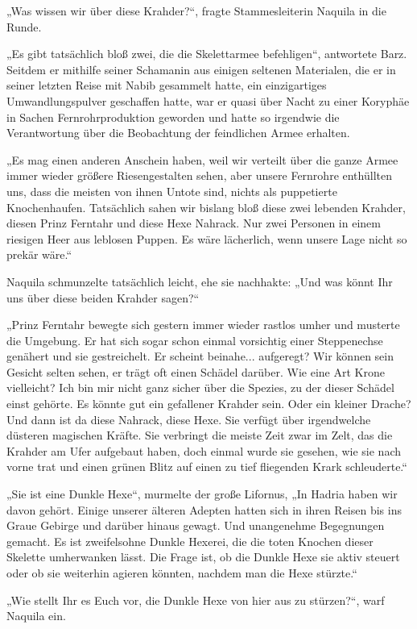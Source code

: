 „Was wissen wir über diese Krahder?“, fragte Stammesleiterin Naquila in die Runde.

„Es gibt tatsächlich bloß zwei, die die Skelettarmee befehligen“, antwortete Barz. Seitdem er mithilfe seiner Schamanin aus einigen seltenen Materialen, die er in seiner letzten Reise mit Nabib gesammelt hatte, ein einzigartiges Umwandlungspulver geschaffen hatte, war er quasi über Nacht zu einer Koryphäe in Sachen Fernrohrproduktion geworden und hatte so irgendwie die Verantwortung über die Beobachtung der feindlichen Armee erhalten.

„Es mag einen anderen Anschein haben, weil wir verteilt über die ganze Armee immer wieder größere Riesengestalten sehen, aber unsere Fernrohre enthüllten uns, dass die meisten von ihnen Untote sind, nichts als puppetierte Knochenhaufen. Tatsächlich sahen wir bislang bloß diese zwei lebenden Krahder, diesen Prinz Ferntahr und diese Hexe Nahrack. Nur zwei Personen in einem riesigen Heer aus leblosen Puppen. Es wäre lächerlich, wenn unsere Lage nicht so prekär wäre.“

Naquila schmunzelte tatsächlich leicht, ehe sie nachhakte: „Und was könnt Ihr uns über diese beiden Krahder sagen?“

„Prinz Ferntahr bewegte sich gestern immer wieder rastlos umher und musterte die Umgebung. Er hat sich sogar schon einmal vorsichtig einer Steppenechse genähert und sie gestreichelt. Er scheint beinahe... aufgeregt? Wir können sein Gesicht selten sehen, er trägt oft einen Schädel darüber. Wie eine Art Krone vielleicht? Ich bin mir nicht ganz sicher über die Spezies, zu der dieser Schädel einst gehörte. Es könnte gut ein gefallener Krahder sein. Oder ein kleiner Drache? Und dann ist da diese Nahrack, diese Hexe. Sie verfügt über irgendwelche düsteren magischen Kräfte. Sie verbringt die meiste Zeit zwar im Zelt, das die Krahder am Ufer aufgebaut haben, doch einmal wurde sie gesehen, wie sie nach vorne trat und einen grünen Blitz auf einen zu tief fliegenden Krark schleuderte.“

„Sie ist eine Dunkle Hexe“, murmelte der große Lifornus, „In Hadria haben wir davon gehört. Einige unserer älteren Adepten hatten sich in ihren Reisen bis ins Graue Gebirge und darüber hinaus gewagt. Und unangenehme Begegnungen gemacht. Es ist zweifelsohne Dunkle Hexerei, die die toten Knochen dieser Skelette umherwanken lässt. Die Frage ist, ob die Dunkle Hexe sie aktiv steuert oder ob sie weiterhin agieren könnten, nachdem man die Hexe stürzte.“

„Wie stellt Ihr es Euch vor, die Dunkle Hexe von hier aus zu stürzen?“, warf Naquila ein.

